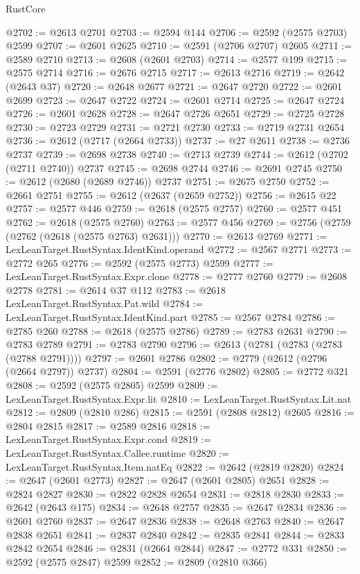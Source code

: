 \begin{lexlean}{RustCore}
\begin{coremodule}
@2702 := @2613 @2701
@2703 := @2594 @144
@2706 := @2592 (@2575 @2703) @2599
@2707 := @2601 @2625
@2710 := @2591 (@2706 @2707) @2605
@2711 := @2589 @2710
@2713 := @2608 (@2601 @2703)
@2714 := @2577 @199
@2715 := @2575 @2714
@2716 := @2676 @2715
@2717 := @2613 @2716
@2719 := @2642 (@2643 @37)
@2720 := @2648 @2677
@2721 := @2647 @2720
@2722 := @2601 @2699
@2723 := @2647 @2722
@2724 := @2601 @2714
@2725 := @2647 @2724
@2726 := @2601 @2628
@2728 := @2647 @2726 @2651
@2729 := @2725 @2728
@2730 := @2723 @2729
@2731 := @2721 @2730
@2733 := @2719 @2731 @2654
@2736 := @2612 (@2717 (@2664 @2733))
@2737 := @27 @2611
@2738 := @2736 @2737
@2739 := @2698 @2738
@2740 := @2713 @2739
@2744 := @2612 (@2702 (@2711 @2740)) @2737
@2745 := @2698 @2744
@2746 := @2691 @2745
@2750 := @2612 (@2680 (@2689 @2746)) @2737
@2751 := @2675 @2750
@2752 := @2661 @2751
@2755 := @2612 (@2637 (@2659 @2752))
@2756 := @2615 @22
@2757 := @2577 @446
@2759 := @2618 (@2575 @2757)
@2760 := @2577 @451
@2762 := @2618 (@2575 @2760)
@2763 := @2577 @456
@2769 := @2756 (@2759 (@2762 (@2618 (@2575 @2763) @2631)))
@2770 := @2613 @2769
@2771 := LexLeanTarget.RustSyntax.IdentKind.operand
@2772 := @2567 @2771
@2773 := @2772 @265
@2776 := @2592 (@2575 @2773) @2599
@2777 := LexLeanTarget.RustSyntax.Expr.clone
@2778 := @2777 @2760
@2779 := @2608 @2778
@2781 := @2614 @37 @112
@2783 := @2618 LexLeanTarget.RustSyntax.Pat.wild
@2784 := LexLeanTarget.RustSyntax.IdentKind.part
@2785 := @2567 @2784
@2786 := @2785 @260
@2788 := @2618 (@2575 @2786)
@2789 := @2783 @2631
@2790 := @2783 @2789
@2791 := @2783 @2790
@2796 := @2613 (@2781 (@2783 (@2783 (@2788 @2791))))
@2797 := @2601 @2786
@2802 := @2779 (@2612 (@2796 (@2664 @2797)) @2737)
@2804 := @2591 (@2776 @2802)
@2805 := @2772 @321
@2808 := @2592 (@2575 @2805) @2599
@2809 := LexLeanTarget.RustSyntax.Expr.lit
@2810 := LexLeanTarget.RustSyntax.Lit.nat
@2812 := @2809 (@2810 @286)
@2815 := @2591 (@2808 @2812) @2605
@2816 := @2804 @2815
@2817 := @2589 @2816
@2818 := LexLeanTarget.RustSyntax.Expr.cond
@2819 := LexLeanTarget.RustSyntax.Callee.runtime
@2820 := LexLeanTarget.RustSyntax.Item.natEq
@2822 := @2642 (@2819 @2820)
@2824 := @2647 (@2601 @2773)
@2827 := @2647 (@2601 @2805) @2651
@2828 := @2824 @2827
@2830 := @2822 @2828 @2654
@2831 := @2818 @2830
@2833 := @2642 (@2643 @175)
@2834 := @2648 @2757
@2835 := @2647 @2834
@2836 := @2601 @2760
@2837 := @2647 @2836
@2838 := @2648 @2763
@2840 := @2647 @2838 @2651
@2841 := @2837 @2840
@2842 := @2835 @2841
@2844 := @2833 @2842 @2654
@2846 := @2831 (@2664 @2844)
@2847 := @2772 @331
@2850 := @2592 (@2575 @2847) @2599
@2852 := @2809 (@2810 @366)

\end{coremodule}
\end{lexlean}
